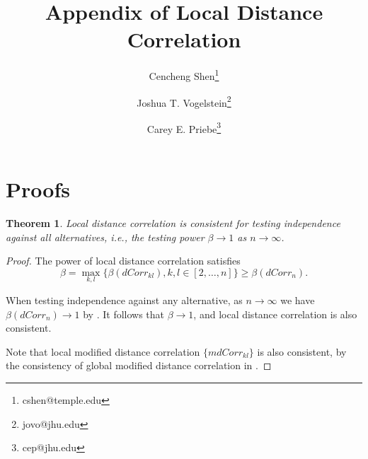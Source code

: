 \documentclass[12pt]{article}
\newtheorem{thm}{Theorem}
\begin{document}
\def\spacingset#1{\renewcommand{\baselinestretch}%
{#1}\small\normalsize} \spacingset{1}

\title{\bf Appendix of Local Distance Correlation}
\author[1]{Cencheng Shen\thanks{cshen@temple.edu}}
\author[2]{Joshua T. Vogelstein\thanks{jovo@jhu.edu}}
\author[3]{Carey E. Priebe\thanks{cep@jhu.edu}}
\maketitle

\newpage
\spacingset{1.45} %

\section{Proofs}
\begin{thm}
\label{thm1}
Local distance correlation is consistent for testing independence against all alternatives, i.e., the testing power $\beta \rightarrow 1$ as $n \rightarrow \infty$. 
\end{thm}
\begin{proof}
The power of local distance correlation satisfies
\begin{equation}
\beta=\max_{k,l}\{\beta(dCorr_{kl}), k,l\in [2,\ldots,n]\} \geq \beta(dCorr_{n}).
\end{equation}

When testing independence against any alternative, as $n \rightarrow \infty$ we have $\beta(dCorr_{n}) \rightarrow 1$ by \cite{SzekelyRizzoBakirov2007}. It follows that $\beta \rightarrow 1$, and local distance correlation is also consistent.

Note that local modified distance correlation $\{mdCorr_{kl}\}$ is also consistent, by the consistency of global modified distance correlation in \cite{SzekelyRizzo2013a}.
\end{proof}
\end{document}

